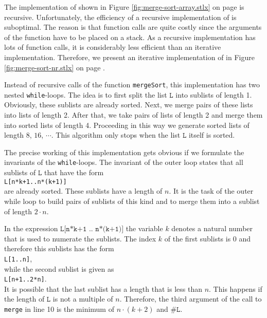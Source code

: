 \noindent
The implementation of  shown in Figure \ref{fig:merge-sort-array.stlx} on page
\pageref{fig:merge-sort-array.stlx} is recursive.  Unfortunately, the efficiency of a recursive
implementation of  is suboptimal.  The reason is that function calls are quite
costly since the arguments of the function have to be placed on a stack.  As a recursive
implementation has lots of function calls, it is considerably less efficient than an iterative
implementation.  Therefore, we present an iterative implementation of  in Figure
\ref{fig:merge-sort-nr.stlx} on page \pageref{fig:merge-sort-nr.stlx}.

Instead of recursive calls of the function \texttt{mergeSort}, this implementation has two nested 
\texttt{while}-loops.  The idea is to first split the list $\texttt{L}$ into sublists of length 1.
Obviously, these sublists are already sorted.  Next, we merge pairs of these lists into lists of
length 2.  After that, we take pairs of lists of length 2 and merge them into sorted lists of length
4. Proceeding in this way we generate sorted lists of length
$8$, $16$, $\cdots$.  This algorithm only stops when the list $\texttt{L}$ itself is sorted.

The precise working of this implementation gets obvious if we formulate the invariants of the
\texttt{while}-loops.  The invariant of the outer loop states that all sublists of $\texttt{L}$ 
that have the form
\\[0.2cm]
\hspace*{1.3cm}
\texttt{L[n*k+1..n*(k+1)]}
\\[0.2cm]
are already sorted.  These sublists have a length of $n$.  It is the task of the outer while loop to build
pairs of sublists of this kind and to merge them into a sublist of length $2 \cdot n$.

In the expression $\texttt{L[n*k+1 .. n*(k+1)]}$ the variable $k$ denotes a natural
number that is used to numerate the sublists.  The index $k$ of the first sublists is $0$ and
therefore this sublists has the form
\\[0.2cm]
\hspace*{1.3cm}
\texttt{L[1..n]},
\\[0.2cm]
while the second sublist is given as
\\[0.2cm]
\hspace*{1.3cm}
\texttt{L[n+1..2*n]}.
\\[0.2cm]
It is possible that the last sublist has a length that is less than $n$.  This happens if the length
of $\texttt{L}$ is not a multiple of $n$.  Therefore, the third argument of the call to \texttt{merge}
in line 10 is the minimum of $n\cdot(k+2)$ and $\texttt{\#L}$.


